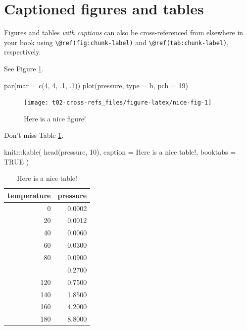 \documentclass[
]{book}
\newenvironment{Shaded}{\begin{snugshade}}{\end{snugshade}}
\newcommand{\AttributeTok}[1]{\textcolor[rgb]{0.77,0.63,0.00}{#1}}
\newcommand{\ConstantTok}[1]{\textcolor[rgb]{0.00,0.00,0.00}{#1}}
\newcommand{\DecValTok}[1]{\textcolor[rgb]{0.00,0.00,0.81}{#1}}
\newcommand{\FunctionTok}[1]{\textcolor[rgb]{0.00,0.00,0.00}{#1}}
\newcommand{\NormalTok}[1]{#1}
\newcommand{\SpecialCharTok}[1]{\textcolor[rgb]{0.00,0.00,0.00}{#1}}
\newcommand{\StringTok}[1]{\textcolor[rgb]{0.31,0.60,0.02}{#1}}
\theoremstyle{definition}
\theoremstyle{definition}
\theoremstyle{definition}
\theoremstyle{definition}
\theoremstyle{remark}
\begin{document}
\hypertarget{captioned-figures-and-tables}{%
\section{Captioned figures and tables}\label{captioned-figures-and-tables}}

Figures and tables \emph{with captions} can also be cross-referenced from elsewhere in your book using \texttt{\textbackslash{}@ref(fig:chunk-label)} and \texttt{\textbackslash{}@ref(tab:chunk-label)}, respectively.

See Figure \ref{fig:nice-fig}.

\begin{Shaded}
\begin{Highlighting}[]
\FunctionTok{par}\NormalTok{(}\AttributeTok{mar =} \FunctionTok{c}\NormalTok{(}\DecValTok{4}\NormalTok{, }\DecValTok{4}\NormalTok{, .}\DecValTok{1}\NormalTok{, .}\DecValTok{1}\NormalTok{))}
\FunctionTok{plot}\NormalTok{(pressure, }\AttributeTok{type =} \StringTok{\textquotesingle{}b\textquotesingle{}}\NormalTok{, }\AttributeTok{pch =} \DecValTok{19}\NormalTok{)}
\end{Highlighting}
\end{Shaded}

\begin{figure}

{\centering \texttt{[image: t02-cross-refs\_files/figure-latex/nice-fig-1]} 

}

\caption{Here is a nice figure!}\label{fig:nice-fig}
\end{figure}

Don't miss Table \ref{tab:nice-tab}.

\begin{Shaded}
\begin{Highlighting}[]
\NormalTok{knitr}\SpecialCharTok{::}\FunctionTok{kable}\NormalTok{(}
  \FunctionTok{head}\NormalTok{(pressure, }\DecValTok{10}\NormalTok{), }\AttributeTok{caption =} \StringTok{\textquotesingle{}Here is a nice table!\textquotesingle{}}\NormalTok{,}
  \AttributeTok{booktabs =} \ConstantTok{TRUE}
\NormalTok{)}
\end{Highlighting}
\end{Shaded}

\begin{table}

\caption{\label{tab:nice-tab}Here is a nice table!}
\centering
\begin{tabular}[t]{rr}
\toprule
temperature & pressure\\
\midrule
0 & 0.0002\\
20 & 0.0012\\
40 & 0.0060\\
60 & 0.0300\\
80 & 0.0900\\
\addlinespace
100 & 0.2700\\
120 & 0.7500\\
140 & 1.8500\\
160 & 4.2000\\
180 & 8.8000\\
\bottomrule
\end{tabular}
\end{table}
\end{document}
